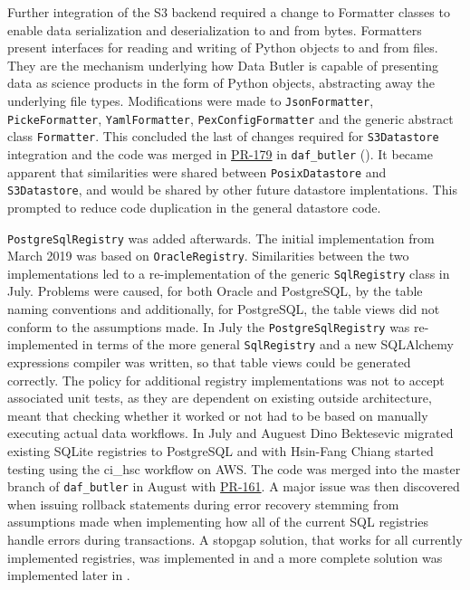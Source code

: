 Further integration of the S3 backend required a change to Formatter classes to enable data serialization and deserialization to and from bytes.
Formatters present interfaces for reading and writing of Python objects to and from files.
They are the mechanism underlying how Data Butler is capable of presenting data as science products in the form of Python objects, abstracting away the underlying file types.
Modifications were made to \texttt{JsonFormatter}, \texttt{PickeFormatter}, \texttt{YamlFormatter}, \texttt{PexConfigFormatter} and the generic abstract class \texttt{Formatter}.
This concluded the last of changes required for \texttt{S3Datastore} integration and the code was merged in \href{https://github.com/lsst/daf_butler/pull/179}{PR-179} in \texttt{daf\_butler} ().
It became apparent that similarities were shared between \texttt{PosixDatastore} and \texttt{S3Datastore}, and would be shared by other future datastore implentations.
This prompted  to reduce code duplication in the general datastore code.

\texttt{PostgreSqlRegistry} was added afterwards.
The initial implementation from March 2019 was based on \texttt{OracleRegistry}.
Similarities between the two implementations led to a re-implementation of the generic \texttt{SqlRegistry} class in July.
Problems were caused, for both Oracle and PostgreSQL, by the table naming conventions and additionally, for PostgreSQL, the table views did not conform to the assumptions made.
In July the \texttt{PostgreSqlRegistry} was re-implemented in terms of the more general \texttt{SqlRegistry} and a new SQLAlchemy expressions compiler was written, so that table views could be generated correctly.
The policy for additional registry implementations was not to accept associated unit tests, as they are dependent on existing outside architecture, meant that checking whether it worked or not had to be based on manually executing actual data workflows.
In July and Auguest Dino Bektesevic migrated existing SQLite registries to PostgreSQL and with Hsin-Fang Chiang started testing using the ci\_hsc workflow on AWS.
The code was merged into the master branch of \texttt{daf\_butler} in August with \href{https://github.com/lsst/daf_butler/pull/161}{PR-161}.
A major issue was then discovered when issuing rollback statements during error recovery stemming from assumptions made when implementing how all of the current SQL registries handle errors during transactions.
A stopgap solution, that works for all currently implemented registries, was implemented in  and a more complete solution was implemented later in .

